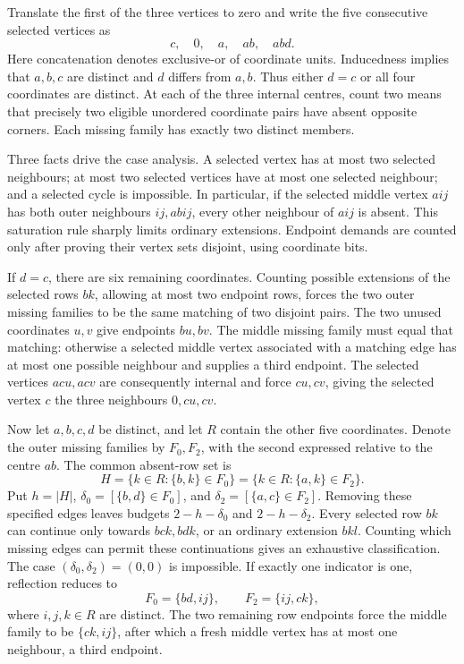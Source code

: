 \documentclass[11pt,a4paper]{article}
\theoremstyle{definition}
\theoremstyle{remark}
\begin{document}
Translate the first of the three vertices to zero and write the five consecutive selected vertices as
\[
c,\quad 0,\quad a,\quad ab,\quad abd.
\]
Here concatenation denotes exclusive-or of coordinate units. Inducedness implies that $a,b,c$ are distinct and $d$ differs from $a,b$. Thus either $d=c$ or all four coordinates are distinct. At each of the three internal centres, count two means that precisely two eligible unordered coordinate pairs have absent opposite corners. Each missing family has exactly two distinct members.

Three facts drive the case analysis. A selected vertex has at most two selected neighbours; at most two selected vertices have at most one selected neighbour; and a selected cycle is impossible. In particular, if the selected middle vertex $aij$ has both outer neighbours $ij,abij$, every other neighbour of $aij$ is absent. This saturation rule sharply limits ordinary extensions. Endpoint demands are counted only after proving their vertex sets disjoint, using coordinate bits.

If $d=c$, there are six remaining coordinates. Counting possible extensions of the selected rows $bk$, allowing at most two endpoint rows, forces the two outer missing families to be the same matching of two disjoint pairs. The two unused coordinates $u,v$ give endpoints $bu,bv$. The middle missing family must equal that matching: otherwise a selected middle vertex associated with a matching edge has at most one possible neighbour and supplies a third endpoint. The selected vertices $acu,acv$ are consequently internal and force $cu,cv$, giving the selected vertex $c$ the three neighbours $0,cu,cv$.

Now let $a,b,c,d$ be distinct, and let $R$ contain the other five coordinates. Denote the outer missing families by $F_0,F_2$, with the second expressed relative to the centre $ab$. The common absent-row set is
\[
H=\{k\in R:\{b,k\}\in F_0\}
 =\{k\in R:\{a,k\}\in F_2\}.
\]
Put $h=|H|$, $\delta_0=[\{b,d\}\in F_0]$, and $\delta_2=[\{a,c\}\in F_2]$. Removing these specified edges leaves budgets $2-h-\delta_0$ and $2-h-\delta_2$. Every selected row $bk$ can continue only towards $bck,bdk$, or an ordinary extension $bkl$. Counting which missing edges can permit these continuations gives an exhaustive classification. The case $(\delta_0,\delta_2)=(0,0)$ is impossible. If exactly one indicator is one, reflection reduces to
\[
F_0=\{bd,ij\},\qquad F_2=\{ij,ck\},
\]
where $i,j,k\in R$ are distinct. The two remaining row endpoints force the middle family to be $\{ck,ij\}$, after which a fresh middle vertex has at most one neighbour, a third endpoint.
\end{document}
